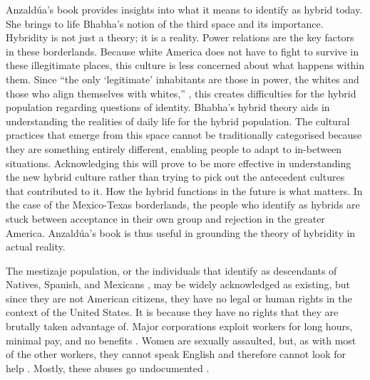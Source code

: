 	Anzaldúa’s book provides insights into what it means to identify as hybrid today. She brings to life Bhabha’s notion of the third space and its importance. Hybridity is not just a theory; it is a reality. Power relations are the key factors in these borderlands. Because white America does not have to fight to survive in these illegitimate places, this culture is less concerned about what happens within them. Since “the only ‘legitimate’ inhabitants are those in power, the whites and those who align themselves with whites,” \parencite[3-4]{Anzaldua_1987}, this creates difficulties for the hybrid population regarding questions of identity. Bhabha’s hybrid theory aids in understanding the realities of daily life for the hybrid population. The cultural practices that emerge from this space cannot be traditionally categorised because they are something entirely different, enabling people to adapt to in-between situations. Acknowledging this will prove to be more effective in understanding the new hybrid culture rather than trying to pick out the antecedent cultures that contributed to it. How the hybrid functions in the future is what matters. In the case of the Mexico-Texas borderlands, the people who identify as hybrids are stuck between acceptance in their own group and rejection in the greater America. Anzaldúa’s book is thus useful in grounding the theory of hybridity in actual reality.
	
	The mestizaje population, or the individuals that identify as descendants of Natives, Spanish, and Mexicans \parencite[5]{Anzaldua_1987}, may be widely acknowledged as existing, but since they are not American citizens, they have no legal or human rights in the context of the United States. It is because they have no rights that they are brutally taken advantage of. Major corporations exploit workers for long hours, minimal pay, and no benefits \parencite[12]{Anzaldua_1987}. Women are sexually assaulted, but, as with most of the other workers, they cannot speak English and therefore cannot look for help \parencite{Anzaldua_1987}. Mostly, these abuses go undocumented \parencite{Anzaldua_1987}.
	

